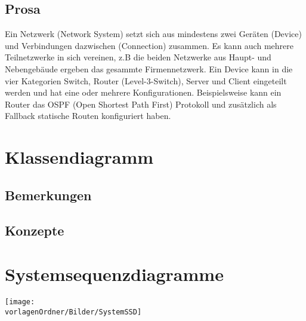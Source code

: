 \documentclass[
	ngerman,
	toc=listof, %
	toc=bibliography, %
	footnotes=multiple, %
	parskip=half, %
	numbers=noendperiod %
]{scrartcl}
\newcommand{\vorlagenOrdner}{../../99_Vorlagen} %
\begin{document}
	\subsection{Prosa}
	Ein Netzwerk (Network System) setzt sich aus mindestens zwei Geräten (Device) und Verbindungen dazwischen (Connection) zusammen.
	Es kann auch mehrere Teilnetzwerke in sich vereinen, z.B die beiden Netzwerke aus Haupt- und Nebengebäude ergeben das gesammte Firmennetzwerk.
	Ein Device kann in die vier Kategorien Switch, Router (Level-3-Switch), Server und Client eingeteilt werden und hat eine oder mehrere Konfigurationen.
	Beispielsweise kann ein Router das OSPF (Open Shortest Path First) Protokoll und zusätzlich als Fallback statische Routen konfiguriert haben.

\section{Klassendiagramm}
	\subsection{Bemerkungen}
	\subsection{Konzepte}

\section{Systemsequenzdiagramme}
	\texttt{[image: \\vorlagenOrdner/Bilder/SystemSSD]}
\end{document}
